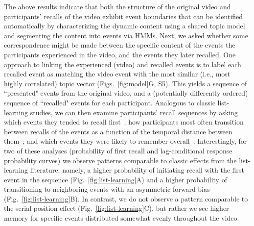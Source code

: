 \documentclass{article}
\newcommand{\matchmats}{S5}
\begin{document}
The above results indicate that both the structure of the original video and participants' recalls of the video exhibit event boundaries that can be identified automatically by characterizing the dynamic content using a shared topic model and segmenting the content into events via HMMs.  Next, we asked whether some correspondence might be made between the specific content of the events the participants experienced in the video, and the events they later recalled.  One approach to linking the experienced (video) and recalled events is to label each recalled event as matching the video event with the most similar (i.e., most highly correlated) topic vector (Figs.~\ref{fig:model}G, \matchmats).  This yields a sequence of ``presented" events from the original video, and a (potentially differently ordered) sequence of ``recalled" events for each participant.  Analogous to classic list-learning studies, we can then examine participants' recall sequences by asking which events they tended to recall first~\citep[probability of first recall; Fig.~\ref{fig:list-learning}A;][]{AtkiShif68, PostPhil65, WelcBurn24}; how participants most often transition between recalls of the events as a function of the temporal distance between them~\citep[lag-conditional response probability; Fig.~\ref{fig:list-learning}B;][]{Kaha96}; and which events they were likely to remember overall~\citep[serial position recall analyses; Fig.~\ref{fig:list-learning}C;][]{Murd62a}. Interestingly, for two of these analyses (probability of first recall and lag-conditional response probability curves) we observe patterns comparable to classic effects from the list-learning literature: namely, a higher probability of initiating recall with the first event in the sequence (Fig.~\ref{fig:list-learning}A) and a higher probability of transitioning to neighboring events with an asymmetric forward bias (Fig.~\ref{fig:list-learning}B). In contrast, we do not observe a pattern comparable to the serial position effect (Fig.~\ref{fig:list-learning}C), but rather we see higher memory for specific events distributed somewhat evenly throughout the video.
\end{document}

